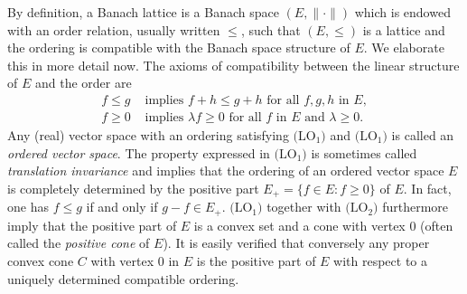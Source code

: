 By definition, a Banach lattice is a Banach space $ (E,\|\cdot\|) $ which is endowed with an order relation, usually written $ \leq $, such that $ (E,\leq) $ is a lattice and the ordering is compatible with the Banach space structure of $ E $.
We elaborate this in more detail now.
The axioms of compatibility between the linear structure of $ E $ and the order are 
\begin{align*}
 f \leq g &\text{ implies } f + h \leq g + h \text{ for all } f, g, h \text{ in } E ,  \tag{LO1}\\
 f \geq 0 &\text{ implies } \lambda f \geq 0 \text{ for all } f \text{ in } E \text{ and } \lambda \geq 0 . \tag{LO2}
\end{align*}
Any (real) vector space with an ordering satisfying $ \text{(LO$_{1}$)} $ and $ \text{(LO$_{1}$)} $ is called an \emph{ordered vector space}.
The property expressed in $\text{(LO$_{1}$)}$ is sometimes called \emph{translation invariance} and implies that the ordering of an ordered vector space $ E $ is completely determined by the positive part $ E_{+} = \{f \in E \colon f \geq 0\} $ of $ E $.
In fact, one has $ f \leq g $ if and only if $ g - f \in E_{+} $.
$ \text{(LO$_{1}$)} $ together with $ \text{(LO$_{2}$)} $ furthermore imply that the positive part of $ E $ is a convex set and a cone with vertex $ 0 $ (often called the \emph{positive cone} of $ E $).
It is easily verified that conversely any proper convex cone $ C $ with vertex $ 0 $ in $ E $ is the positive part of $ E $ with respect to a uniquely determined compatible ordering.

